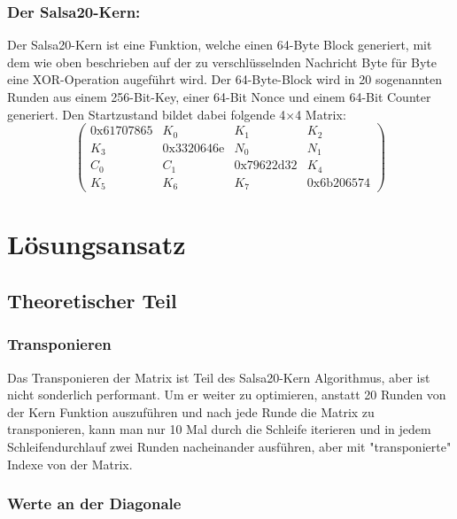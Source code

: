 \documentclass[course=erap]{aspdoc}
\begin{document}
\subsubsection{Der Salsa20-Kern:}
Der Salsa20-Kern ist eine Funktion, welche einen 64-Byte Block generiert, mit dem wie oben beschrieben auf der zu verschlüsselnden Nachricht Byte für Byte eine XOR-Operation augeführt wird.
Der 64-Byte-Block wird in 20 sogenannten Runden aus einem 256-Bit-Key, einer 64-Bit Nonce und einem 64-Bit Counter generiert.
Den Startzustand bildet dabei folgende 4$\times$4 Matrix:
\[
    \begin{pmatrix}
    0\text{x}61707865 & K_0 & K_1 & K_2\\
    K_3 & 0\text{x}3320646\text{e} & N_0 & N_1\\
    C_0 & C_1 & 0\text{x}79622\text{d}32 & K_4\\
    K_5 & K_6 & K_7 & 0\text{x}6\text{b}206574
    \end{pmatrix}
\]


\section{Lösungsansatz}
\subsection{Theoretischer Teil}
\subsubsection{Transponieren}
Das Transponieren der Matrix ist Teil des Salsa20-Kern Algorithmus, aber ist nicht sonderlich performant. Um er weiter zu optimieren, 
anstatt 20 Runden von der Kern Funktion auszuführen und nach jede Runde die Matrix zu transponieren, kann man nur 10 Mal durch die Schleife iterieren
und in jedem Schleifendurchlauf zwei Runden nacheinander ausführen, aber mit "transponierte" Indexe von der Matrix.   
\subsubsection{Werte an der Diagonale}
\end{document}
